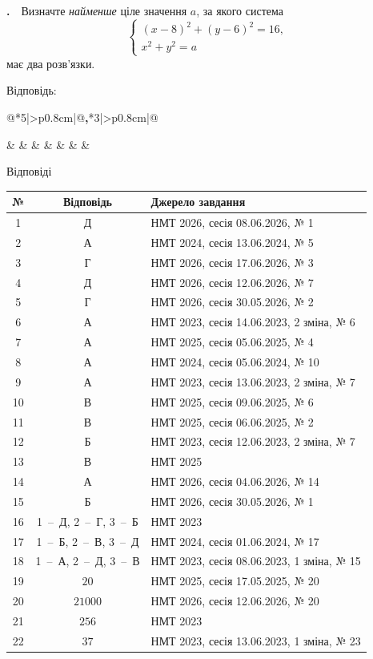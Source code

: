 \documentclass[12pt]{article}
\makeatletter
\newcommand{\sectionTitle}[1]{%
\par\vspace{0.4cm}
\begin{tcolorbox}[colback=titleBg, colframe=titleBg, boxrule=0pt, arc=8pt,
    halign=center, fontupper=\Large\bfseries\color{mainGreen}]
\hyphenpenalty=10000 \exhyphenpenalty=10000 #1
\end{tcolorbox}
\par\vspace{0.3cm}
}
\newcommand{\nmtAnswerBox}{%
\par\nopagebreak\vspace{0.2cm}\noindent
Відповідь:\ \
\begin{tabular}{@{}*{4}{|>{\centering\arraybackslash}p{0.8cm}}|@{\hspace{0.1cm}\textbf{,}\hspace{0.1cm}}*{3}{|>{\centering\arraybackslash}p{0.8cm}}|@{}}
\hline
\rule[-0.2cm]{0pt}{0.7cm} & & & & & & \\
\hline
\end{tabular}
\par\vspace{0.3cm}
}
\newcounter{zad}
\newcommand{\zadnum}{\stepcounter{zad}\textbf{\thezad.}\ \ }
\newcommand{\nbvspace}[1]{\nopagebreak\vspace{#1}}
\newcommand{\nmtnobreak}{\ifvmode\penalty10000 \fi}
\renewcommand{\nmtAnswerBox}{%
\par\nopagebreak\vspace{0.2cm}\noindent
Відповідь:\ \
\begin{tabular}{@{}*{5}{|>{\centering\arraybackslash}p{0.8cm}}|@{\hspace{0.1cm}\textbf{,}\hspace{0.1cm}}*{3}{|>{\centering\arraybackslash}p{0.8cm}}|@{}}
\hline
\rule[-0.2cm]{0pt}{0.7cm} & & & & & & & \\
\hline
\end{tabular}
\par\vspace{0.3cm}
}
\makeatother
\begin{document}
\begin{samepage}
\noindent\zadnum Визначте \textit{найменше} ціле значення $a$, за якого система
$$
\begin{cases}
(x - 8)^2 + (y - 6)^2 = 16, \\
x^2 + y^2 = a
\end{cases}
$$
має два розв'язки.

\nmtnobreak
\nopagebreak\nbvspace{0.3cm}
\nmtAnswerBox
\par{}
\end{samepage}
\endgroup

\clearpage
\sectionTitle{Відповіді}

\begin{center}\small\renewcommand{\arraystretch}{1.25}
\begin{tabular}{|c|c|p{}|}\hline
\textbf{№} & \textbf{Відповідь} & \textbf{Джерело завдання} \\ \hline
1 & Д & НМТ 2026, сесія 08.06.2026, № 1 \\ \hline
2 & А & НМТ 2024, сесія 13.06.2024, № 5 \\ \hline
3 & Г & НМТ 2026, сесія 17.06.2026, № 3 \\ \hline
4 & Д & НМТ 2026, сесія 12.06.2026, № 7 \\ \hline
5 & Г & НМТ 2026, сесія 30.05.2026, № 2 \\ \hline
6 & А & НМТ 2023, сесія 14.06.2023, 2 зміна, № 6 \\ \hline
7 & А & НМТ 2025, сесія 05.06.2025, № 4 \\ \hline
8 & А & НМТ 2024, сесія 05.06.2024, № 10 \\ \hline
9 & А & НМТ 2023, сесія 13.06.2023, 2 зміна, № 7 \\ \hline
10 & В & НМТ 2025, сесія 09.06.2025, № 6 \\ \hline
11 & В & НМТ 2025, сесія 06.06.2025, № 2 \\ \hline
12 & Б & НМТ 2023, сесія 12.06.2023, 2 зміна, № 7 \\ \hline
13 & В & НМТ 2025 \\ \hline
14 & А & НМТ 2026, сесія 04.06.2026, № 14 \\ \hline
15 & Б & НМТ 2026, сесія 30.05.2026, № 1 \\ \hline
16 & 1~--~Д, 2~--~Г, 3~--~Б & НМТ 2023 \\ \hline
17 & 1~--~Б, 2~--~В, 3~--~Д & НМТ 2024, сесія 01.06.2024, № 17 \\ \hline
18 & 1~--~А, 2~--~Д, 3~--~В & НМТ 2023, сесія 08.06.2023, 1 зміна, № 15 \\ \hline
19 & $20$ & НМТ 2025, сесія 17.05.2025, № 20 \\ \hline
20 & $21000$ & НМТ 2026, сесія 12.06.2026, № 20 \\ \hline
21 & $256$ & НМТ 2023 \\ \hline
22 & $37$ & НМТ 2023, сесія 13.06.2023, 1 зміна, № 23 \\ \hline
\end{tabular}\end{center}

\end{document}
